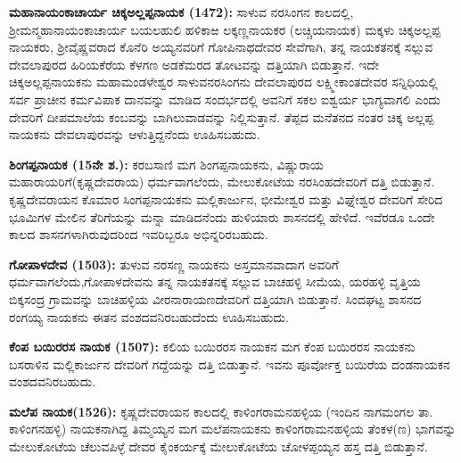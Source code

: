 \textbf{ಮಹಾನಾಯಂಕಾಚಾರ್ಯ ಚಿಕ್ಕಅಲ್ಲಪ್ಪನಾಯಕ (1472):} ಸಾಳುವ ನರಸಿಂಗನ ಕಾಲದಲ್ಲಿ, ಶ‍್ರೀಮನ್ಮಹಾನಾಯಂಕಾ\-ಚಾರ್ಯ ಬಯಲಹುಲಿ ಹಳಿಕಾಱ ಲಕ್ಕಣ್ಣನಾಯಕರ (ಲಚ್ಚಿಯನಾಯಕ) ಮಕ್ಕಳು ಚಿಕ್ಕಅಲ್ಲಪ್ಪ ನಾಯಕರು, ಶ‍್ರೀವೈಷ್ಣವರಾದ ಕೊನೆರಿ ಅಯ್ಯನವರಿಗೆ ಗೋಪಿನಾಥದೇವರ ಸೇವೆಗಾಗಿ, ತನ್ನ ನಾಯಕತನಕ್ಕೆ ಸಲ್ಲುವ ದೇವಲಾಪುರದ ಹಿರಿಯಕೆರೆಯ ಕೆಳಗಣ ಅಡಕೆಮರದ ತೋಟವನ್ನು ದತ್ತಿಯಾಗಿ ಬಿಡುತ್ತಾನೆ. ಇದೇ ಚಿಕ್ಕಅಲ್ಲಪ್ಪನಾಯಕನು ಮಹಾಮಂಡಳೇಶ್ವರ ಸಾಳುವ\break ನರಸಿಂಗನು ದೇವಲಾಪುರದ ಲಕ್ಷ್ಮೀಕಾಂತದೇವರ ಸನ್ನಿಧಿಯಲ್ಲಿ ಸರ್ವ ಪ್ರಾಚೀನ ಕರ್ಮವಿಪಾಕ ದಾನವನ್ನು ಮಾಡಿದ ಸಂದರ್ಭದಲ್ಲಿ ಅವನಿಗೆ ಸಕಲ ಐಶ್ವರ್ಯ ಭಾಗ್ಯವಾಗಲಿ ಎಂದು ದೇವರಿಗೆ ದೀಪಮಾಲೆಯ ಕಂಬವನ್ನು ಬಾಗಿಲುವಾಡವನ್ನು ನಿಲ್ಲಿಸುತ್ತಾನೆ. ತೆಪ್ಪದ ಮನೆತನದ ನಂತರ ಚಿಕ್ಕ ಅಲ್ಲಪ್ಪ ನಾಯಕನು ದೇವಲಾಪುರವನ್ನು ಆಳುತ್ತಿದ್ದನೆಂದು ಊಹಿಸಬಹುದು.

\textbf{ಶಿಂಗಪ್ಪನಾಯಕ (15ನೇ ಶ.):} ಕರಬಸಾಣಿ ಮಗ ಶಿಂಗಪ್ಪನಾಯಕನು, ವಿಷ್ಣುರಾಯ ಮಹಾರಾಯರಿಗೆ\break (ಕೃಷ್ಣದೇವರಾಯ) ಧರ್ಮವಾಗಲೆಂದು, ಮೇಲುಕೋಟೆಯ ನರಸಿಂಹದೇವರಿಗೆ ದತ್ತಿ ಬಿಡುತ್ತಾನೆ. ಕೃಷ್ಣದೇವರಾಯನ ಕೊಮಾರ ಸಿಂಗಪ್ಪನಾಯಕನು ಮಲ್ಲಿಕಾರ್ಜುನ, ಭೀಮೇಶ್ವರ ಮತ್ತು ವಿಘ್ನೇಶ್ವರ ದೇವರಿಗೆ ಸೇರಿದ ಭೂಮಿಗಳ ಮೇಲಿನ ತೆರಿಗೆಯನ್ನು ಮನ್ನಾ ಮಾಡಿದನೆಂದು ಹುಳಿಯಾರು ಶಾಸನದಲ್ಲಿ ಹೇಳಿದೆ. ಇವೆರಡೂ ಒಂದೇ ಕಾಲದ ಶಾಸನಗಳಾಗಿರುವುದರಿಂದ ಇವರಿಬ್ಬರೂ ಅಭಿನ್ನರಿರಬಹುದು.

\textbf{ಗೋಪಾಳದೇವ (1503):} ತುಳುವ ನರಸಣ್ಣ ನಾಯಕನು ಅಸ್ತಮಾನವಾದಾಗ ಅವರಿಗೆ ಧರ್ಮವಾಗಲೆಂದು,\break ಗೋಪಾಳದೇವನು ತನ್ನ ನಾಯಕತನಕ್ಕೆ ಸಲ್ಲುವ ಬಾಚಹಳ್ಳಿ ಸೀಮೆಯ, ಯರಹಳ್ಳಿ ವೃತ್ತಿಯ ಬಿಕ್ಕಸಂದ್ರ ಗ್ರಾಮವನ್ನು ಬಾಚಿಹಳ್ಳಿಯ ವೀರನಾರಾಯಣದೇವರಿಗೆ ದತ್ತಿಯಾಗಿ ಬಿಡುತ್ತಾನೆ. ಸಿಂದಘಟ್ಟ ಶಾಸನದ ರಂಗಯ್ಯ ನಾಯಕನು ಈತನ ವಂಶದವನಿರಬಹುದೆಂದು ಊಹಿಸಬಹುದು.

\textbf{ಕೆಂಪ ಬಯಿರರಸ ನಾಯಕ (1507):} ಕಲಿಯ ಬಯಿರರಸ ನಾಯಕನ ಮಗ ಕೆಂಪ ಬಯಿರರಸ ನಾಯಕನು ಬಸರಾಳಿನ ಮಲ್ಲಿಕಾರ್ಜುನ ದೇವರಿಗೆ ಗದ್ದೆಯನ್ನು ದತ್ತಿ ಬಿಡುತ್ತಾನೆ. ಇವನು ಪೂರ್ವೋಕ್ತ ಬಯಿರೆಯ ದಂಡನಾಯಕನ ವಂಶದವನಿರಬಹುದು.

\textbf{ಮಲೆಪ ನಾಯಕ(1526):} ಕೃಷ್ಣದೇವರಾಯನ ಕಾಲದಲ್ಲಿ ಕಾಳಿಂಗರಾಮನಹಳ್ಳಿಯ (ಇಂದಿನ ನಾಗಮಂಗಲ ತಾ. ಕಾಳಿಂಗನಹಳ್ಳಿ) ನಾಯಕನಾಗಿದ್ದ ತಿಮ್ಮಯ್ಯನ ಮಗ ಮಲೆಪನಾಯಕನು ಕಾಳಿಂಗರಾಮನಹಳ್ಳಿಯ ತೆಂಕಳ(ಣ) ಭಾಗವನ್ನು ಮೇಲುಕೋಟೆಯ ಚೆಲುವಪಿಳ್ಳೆ ದೇವರ ಕೈಂಕರ್ಯಕ್ಕೆ ಮೇಲುಕೋಟೆಯ ಚೋಳಪ್ಪಯ್ಯನ ಹಸ್ತ ದತ್ತಿ ಬಿಡುತ್ತಾನೆ.


